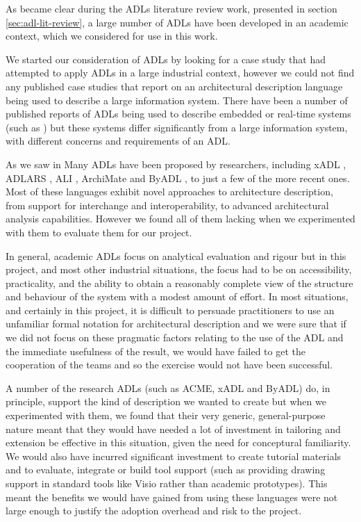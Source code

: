 As became clear during the ADLs literature review work, presented in section \ref{sec:adl-lit-review}, a large number of ADLs have been developed in an academic context, which we considered for use in this work.

We started our consideration of ADLs by looking for a case study that had attempted to apply ADLs in a large industrial context, however we could not find any published case studies that report on an architectural description language being used to describe a large information system. There have been a number of published reports of ADLs being used to describe embedded or real-time systems (such as \cite{feiler2000-realtime, lonn2004-east, cuenot2010-east, vanommering2000-koala, sae2009-aadl}) but these systems differ significantly from a large information system, with different concerns and requirements of an ADL.

As we saw in  Many ADLs have been proposed by researchers, including xADL \cite{khare2001-xadl}, ADLARS \cite{bashroush2005-adlars}, ALI \cite{bashroush2008-ali}, ArchiMate \cite{lankhorst2009-archimate} and ByADL \cite{diruscio2010-byadl}, to just a few of the more recent ones. Most of these languages exhibit novel approaches to architecture description, from support for interchange and interoperability, to advanced architectural analysis capabilities.  However we found all of them lacking when we experimented with them to evaluate them for our project.

In general, academic ADLs focus on analytical evaluation and rigour but in this project, and most other industrial situations, the focus had to be on accessibility, practicality, and the ability to obtain a reasonably complete view of the structure and behaviour of the system with a modest amount of effort. In most situations, and certainly in this project, it is difficult to persuade practitioners to use an unfamiliar formal notation for architectural description and we were sure that if we did not focus on these pragmatic factors relating to the use of the ADL and the immediate usefulness of the result, we would have failed to get the cooperation of the teams and so the exercise would not have been successful.

A number of the research ADLs (such as ACME, xADL and ByADL) do, in principle, support the kind of description we wanted to create but when we experimented with them, we found that their very generic, general-purpose nature meant that they would have needed a lot of investment in tailoring and extension be effective in this situation, given the need for conceptural familiarity.  We would also have incurred significant investment to create tutorial materials and to evaluate, integrate or build tool support (such as providing drawing support in standard tools like Visio rather than academic prototypes). This meant the benefits we would have gained from using these languages were not large enough to justify the adoption overhead and risk to the project.

